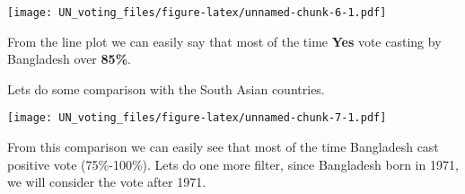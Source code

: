 \documentclass[
]{article}
\newenvironment{Shaded}{\begin{snugshade}}{\end{snugshade}}
\newcommand{\DataTypeTok}[1]{\textcolor[rgb]{0.13,0.29,0.53}{#1}}
\newcommand{\DecValTok}[1]{\textcolor[rgb]{0.00,0.00,0.81}{#1}}
\newcommand{\KeywordTok}[1]{\textcolor[rgb]{0.13,0.29,0.53}{\textbf{#1}}}
\newcommand{\NormalTok}[1]{#1}
\newcommand{\OperatorTok}[1]{\textcolor[rgb]{0.81,0.36,0.00}{\textbf{#1}}}
\newcommand{\StringTok}[1]{\textcolor[rgb]{0.31,0.60,0.02}{#1}}
\begin{document}
\texttt{[image: UN\_voting\_files/figure-latex/unnamed-chunk-6-1.pdf]}

From the line plot we can easily say that most of the time \textbf{Yes}
vote casting by Bangladesh over \textbf{85\%}.

Lets do some comparison with the South Asian countries.

\begin{Shaded}
\end{Shaded}

\texttt{[image: UN\_voting\_files/figure-latex/unnamed-chunk-7-1.pdf]}

From this comparison we can easily see that most of the time Bangladesh
cast positive vote (75\%-100\%). Lets do one more filter, since
Bangladesh born in 1971, we will consider the vote after 1971.
\end{document}
